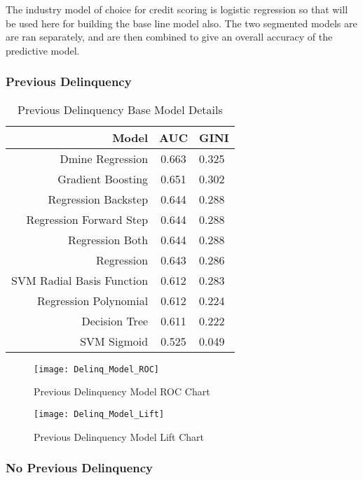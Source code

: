 The industry model of choice for credit scoring is logistic regression so that will be used here for building the base line model also. The two segmented models are are ran separately, and are then combined to give an overall accuracy of the predictive model. 


\subsubsection{Previous Delinquency}

\begin{table}[H]
	\centering
	\begin{tabular}{r | c | l}
		\hline
		\textbf{Model} & \textbf{AUC} & \textbf{GINI} \\
		\hline
		Dmine Regression          & 0.663        & 0.325 \\
		Gradient Boosting          & 0.651        & 0.302 \\
		Regression Backstep          & 0.644        & 0.288 \\
		Regression Forward Step          & 0.644        & 0.288 \\
		Regression Both          & 0.644        & 0.288 \\
		Regression          & 0.643        & 0.286 \\
		SVM Radial Basis Function          & 0.612        & 0.283 \\
		Regression Polynomial          & 0.612        & 0.224 \\
		Decision Tree          & 0.611        & 0.222 \\
		SVM Sigmoid          & 0.525        & 0.049 \\
		\hline
	\end{tabular}
	\caption{Previous Delinquency Base Model Details}
\end{table}


\begin{figure}[h!]
	\texttt{[image: Delinq\_Model\_ROC]}
	\caption{Previous Delinquency Model ROC Chart}
	\label{fig:Delinq_Model_ROC}
\end{figure}

\begin{figure}[h!]
	\texttt{[image: Delinq\_Model\_Lift]}
	\caption{Previous Delinquency Model Lift Chart}
	\label{fig:Delinq_Model_Lift}
\end{figure}


\subsubsection{No Previous Delinquency}

